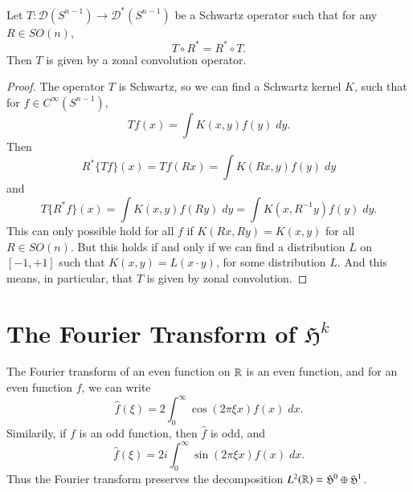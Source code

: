 \begin{theorem}
    Let $T: \mathcal{D}(S^{n-1}) \to \mathcal{D}^*(S^{n-1})$ be a Schwartz operator such that for any $R \in SO(n)$,
    \[ T \circ R^* = R^* \circ T. \]
    Then $T$ is given by a zonal convolution operator.
\end{theorem}
\begin{proof}
    The operator $T$ is Schwartz, so we can find a Schwartz kernel $K$, such that for $f \in C^\infty(S^{n-1})$,
    \[ Tf(x) = \int K(x,y) f(y)\; dy. \]
    Then
    \[ R^* \{ Tf \}(x) = Tf(Rx) = \int K(Rx, y) f(y)\; dy \]
    and
    \[ T \{ R^* f \}(x) = \int K(x,y) f(Ry)\; dy = \int K(x, R^{-1} y) f(y)\; dy. \]
    This can only possible hold for all $f$ if $K(Rx,Ry) = K(x,y)$ for all $R \in SO(n)$. But this holds if and only if we can find a distribution $L$ on $[-1,+1]$ such that $K(x,y) = L(x \cdot y)$, for some distribution $L$. And this means, in particular, that $T$ is given by zonal convolution.
\end{proof}



\section{The Fourier Transform of $\mathfrak{H}^k$}

The Fourier transform of an even function on $\operatorname{\mathbb{R}}$ is an even function, and for an even function $f$, we can write
%
\[ \widehat{f}(\xi) = 2 \int_0^\infty \cos(2 \pi \xi x) f(x)\; dx. \]
%
Similarily, if $f$ is an odd function, then $\widehat{f}$ is odd, and
%
\[ \widehat{f}(\xi) = 2i \int_0^\infty \sin(2 \pi \xi x) f(x)\; dx. \]
%
Thus the Fourier transform preserves the decomposition $L^2(\operatorname{\mathbb{R}}) = \mathfrak{H}^0 \oplus \mathfrak{H}^1$.

